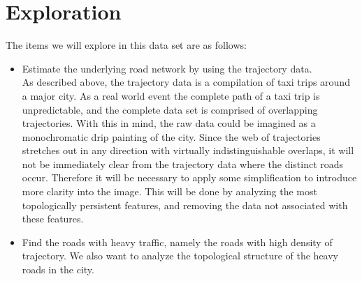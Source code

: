 \documentclass[11pt]{article}
\begin{document}
\section*{Exploration} 
The items we will explore in this data set are as follows: 
\begin{itemize}
	\item Estimate the underlying road network  by using the trajectory data.\\ 
	As described above, the trajectory data is a compilation of taxi trips around a major city. As a real world event the complete path of a taxi trip is unpredictable, and the complete data set is comprised of overlapping trajectories. With this in mind, the raw data could be imagined as a monochromatic drip painting of the city. Since the web of trajectories stretches out in any direction with virtually indistinguishable overlaps, it will not be immediately clear from the trajectory data where the distinct roads occur. Therefore it will be necessary to apply some simplification to introduce more clarity into the image. This will be done by analyzing the most topologically persistent features, and removing the data not associated with these features.%
	
	\item  Find the roads with heavy traffic, namely the roads with high density of trajectory.   We also want to analyze the topological structure of the heavy roads in the city.
\end{itemize}

\end{document}
